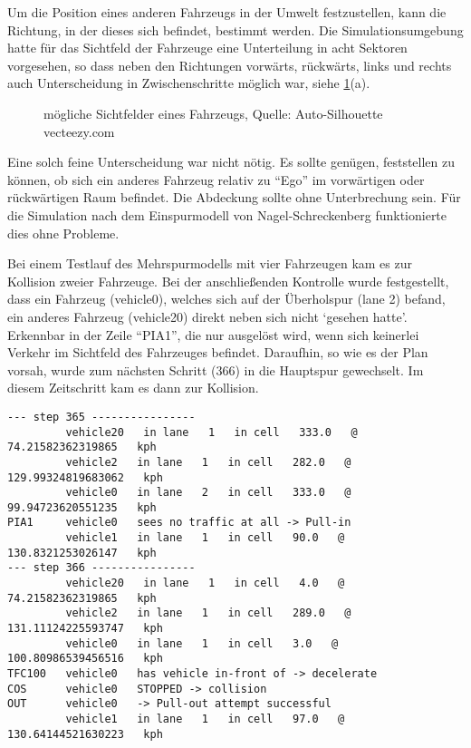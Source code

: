 Um die Position eines anderen Fahrzeugs in der Umwelt festzustellen, kann die Richtung, in der dieses sich befindet, bestimmt werden.
Die Simulationsumgebung hatte für das Sichtfeld der Fahrzeuge eine Unterteilung in acht Sektoren vorgesehen, so dass neben den Richtungen vorwärts, rückwärts, links und rechts auch Unterscheidung in Zwischenschritte möglich war, siehe \cref{figure:car-view-sectors}(a).

\begin{figure}[hptb]
  \centering 
   \qquad 
   \qquad 
  \caption{mögliche Sichtfelder eines Fahrzeugs, Quelle: Auto-Silhouette vecteezy.com} 
  \label{figure:car-view-sectors}
\end{figure}

Eine solch feine Unterscheidung war nicht nötig.
Es sollte genügen, feststellen zu können, ob sich ein anderes Fahrzeug relativ zu \enquote{Ego} im vorwärtigen oder rückwärtigen Raum befindet. 
Die Abdeckung sollte ohne Unterbrechung sein.
Für die Simulation nach dem Einspurmodell von Nagel-Schreckenberg funktionierte dies ohne Probleme.

Bei einem Testlauf des Mehrspurmodells mit vier Fahrzeugen kam es zur Kollision zweier Fahrzeuge. 
Bei der anschließenden Kontrolle wurde festgestellt, dass ein Fahrzeug (vehicle0), welches sich auf der Überholspur (lane 2) befand, ein anderes Fahrzeug (vehicle20) direkt neben sich nicht \enquote*{gesehen hatte}. 
Erkennbar in der Zeile \enquote{PIA1}, die nur ausgelöst wird, wenn sich keinerlei Verkehr im Sichtfeld des Fahrzeuges befindet.
Daraufhin, so wie es der Plan vorsah, wurde zum nächsten Schritt (366) in die Hauptspur gewechselt. 
Im diesem Zeitschritt kam es dann zur Kollision.

\begin{verbatim}
--- step 365 ----------------
         vehicle20   in lane   1   in cell   333.0   @   74.21582362319865   kph
         vehicle2   in lane   1   in cell   282.0   @   129.99324819683062   kph
         vehicle0   in lane   2   in cell   333.0   @   99.94723620551235   kph
PIA1     vehicle0   sees no traffic at all -> Pull-in
         vehicle1   in lane   1   in cell   90.0   @   130.8321253026147   kph
--- step 366 ----------------
         vehicle20   in lane   1   in cell   4.0   @   74.21582362319865   kph
         vehicle2   in lane   1   in cell   289.0   @   131.11124225593747   kph
         vehicle0   in lane   1   in cell   3.0   @   100.80986539456516   kph
TFC100   vehicle0   has vehicle in-front of -> decelerate
COS      vehicle0   STOPPED -> collision
OUT      vehicle0   -> Pull-out attempt successful
         vehicle1   in lane   1   in cell   97.0   @   130.64144521630223   kph
\end{verbatim}

